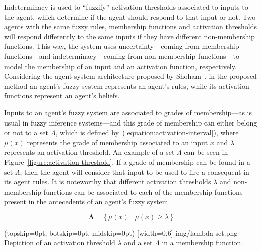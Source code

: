 ﻿\documentclass{ieeeaccess}
\begin{document}
Indeterminacy is used to ``fuzzify'' activation thresholds associated to inputs
to the agent, which determine if the agent should respond to that
input or not. Two agents with the same fuzzy rules, membership
functions and activation thresholds will respond differently to the
same inputs if they have different non-membership functions. This way,
the system uses uncertainty---coming from membership functions---and
indeterminacy---coming from non-membership functions---to model the
membership of an input and an activation function,
respectively. Considering the agent system architecture proposed by
Shoham~\cite{Shoham1993}, in the proposed method an agent's fuzzy system
represents an agent's rules, while its activation functions represent an
agent's beliefs.

Inputs to an agent's fuzzy system are associated to grades of
membership---as is usual in fuzzy inference systems---and this grade
of membership can either belong or not to a set $\Lambda$, which is
defined by~(\ref{equation:activation-interval}), where $\mu(x)$
represents the grade of membership associated to an input $x$ and
$\lambda$ represents an activation threshold. An example of a set
$\Lambda$ can be seen in Figure~\ref{figure:activation-threshold}. If
a grade of membership can be found in a set $\Lambda$, then the agent
will consider that input to be used to fire a consequent in its agent
rules. It is noteworthy that different activation thresholds $\lambda$
and non-membership functions can be associated to each of the
membership functions present in the antecedents of an agent's fuzzy
system.

\begin{equation}
  \label{equation:activation-interval}
  \bm{\Lambda} = \{\,\mu(x) \mid \mu(x) \geq \lambda \,\}
\end{equation}

\Figure[](topskip=0pt, botskip=0pt, midskip=0pt)
[width=0.6\linewidth]
{img/lambda-set.png}
{Depiction of an activation threshold $\lambda$ and a set $\Lambda$ in a membership function.
  \label{figure:activation-threshold}}
\end{document}
